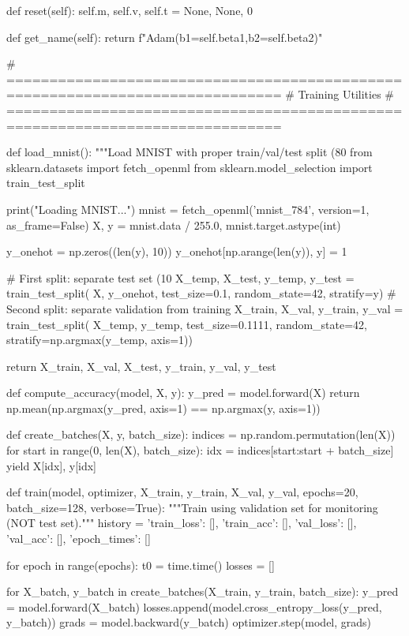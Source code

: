 \documentclass[../../main.tex]{subfiles}
\begin{document}
\begin{pythoncode}
    def reset(self):
        self.m, self.v, self.t = None, None, 0

    def get_name(self):
        return f"Adam(b1={self.beta1},b2={self.beta2})"


# ==============================================================================
# Training Utilities
# ==============================================================================

def load_mnist():
    """Load MNIST with proper train/val/test split (80%
    from sklearn.datasets import fetch_openml
    from sklearn.model_selection import train_test_split

    print("Loading MNIST...")
    mnist = fetch_openml('mnist_784', version=1, as_frame=False)
    X, y = mnist.data / 255.0, mnist.target.astype(int)

    y_onehot = np.zeros((len(y), 10))
    y_onehot[np.arange(len(y)), y] = 1

    # First split: separate test set (10%
    X_temp, X_test, y_temp, y_test = train_test_split(
        X, y_onehot, test_size=0.1, random_state=42, stratify=y)
    # Second split: separate validation from training
    X_train, X_val, y_train, y_val = train_test_split(
        X_temp, y_temp, test_size=0.1111, random_state=42,
        stratify=np.argmax(y_temp, axis=1))

    return X_train, X_val, X_test, y_train, y_val, y_test


def compute_accuracy(model, X, y):
    y_pred = model.forward(X)
    return np.mean(np.argmax(y_pred, axis=1) == np.argmax(y, axis=1))


def create_batches(X, y, batch_size):
    indices = np.random.permutation(len(X))
    for start in range(0, len(X), batch_size):
        idx = indices[start:start + batch_size]
        yield X[idx], y[idx]


def train(model, optimizer, X_train, y_train, X_val, y_val,
          epochs=20, batch_size=128, verbose=True):
    """Train using validation set for monitoring (NOT test set)."""
    history = {'train_loss': [], 'train_acc': [],
               'val_loss': [], 'val_acc': [], 'epoch_times': []}

    for epoch in range(epochs):
        t0 = time.time()
        losses = []

        for X_batch, y_batch in create_batches(X_train, y_train, batch_size):
            y_pred = model.forward(X_batch)
            losses.append(model.cross_entropy_loss(y_pred, y_batch))
            grads = model.backward(y_batch)
            optimizer.step(model, grads)


\end{pythoncode}
\end{document}
